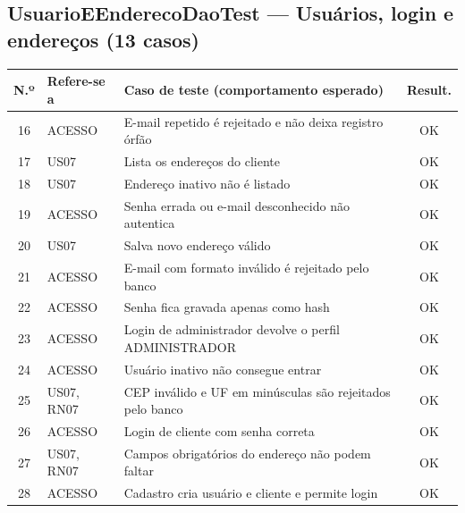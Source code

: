 \subsection*{UsuarioEEnderecoDaoTest --- Usuários, login e endereços (13 casos)}
\footnotesize
\begin{longtable}{|c|p{2.5cm}|p{8.4cm}|c|}
\hline
\rowcolor{gray!30} \textbf{N.º} & \textbf{Refere-se a} & \textbf{Caso de teste (comportamento esperado)} & \textbf{Result.} \\ \hline
\endhead
16 & ACESSO & E-mail repetido é rejeitado e não deixa registro órfão & \cellcolor{green!20}OK \\ \hline
17 & US07 & Lista os endereços do cliente & \cellcolor{green!20}OK \\ \hline
18 & US07 & Endereço inativo não é listado & \cellcolor{green!20}OK \\ \hline
19 & ACESSO & Senha errada ou e-mail desconhecido não autentica & \cellcolor{green!20}OK \\ \hline
20 & US07 & Salva novo endereço válido & \cellcolor{green!20}OK \\ \hline
21 & ACESSO & E-mail com formato inválido é rejeitado pelo banco & \cellcolor{green!20}OK \\ \hline
22 & ACESSO & Senha fica gravada apenas como hash & \cellcolor{green!20}OK \\ \hline
23 & ACESSO & Login de administrador devolve o perfil ADMINISTRADOR & \cellcolor{green!20}OK \\ \hline
24 & ACESSO & Usuário inativo não consegue entrar & \cellcolor{green!20}OK \\ \hline
25 & US07, RN07 & CEP inválido e UF em minúsculas são rejeitados pelo banco & \cellcolor{green!20}OK \\ \hline
26 & ACESSO & Login de cliente com senha correta & \cellcolor{green!20}OK \\ \hline
27 & US07, RN07 & Campos obrigatórios do endereço não podem faltar & \cellcolor{green!20}OK \\ \hline
28 & ACESSO & Cadastro cria usuário e cliente e permite login & \cellcolor{green!20}OK \\ \hline
\end{longtable}\normalsize
